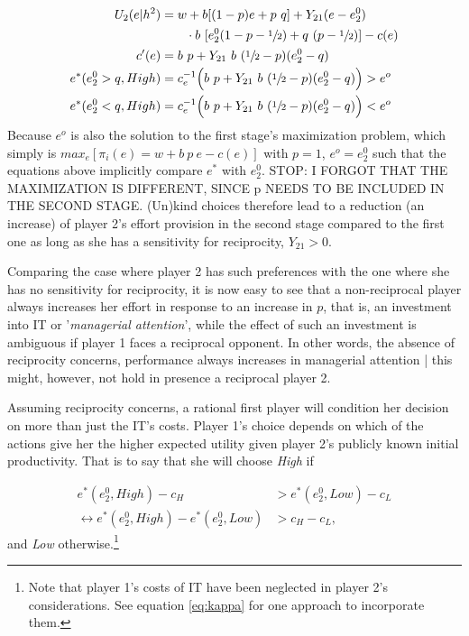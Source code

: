 \vspace{-10mm}
\begin{align*}
	U_2(e|h^2) & = w+b[(1-p)e+p\ q] + Y_{21}(e - e^0_2)\\ 
	& \qquad\cdot b\ [e^0_2(1-p-\sfrac{1}{2})+q\ (p-\sfrac{1}{2})]-c(e)\\
	c'(e) & =  b\ p + Y_{21}\ b\ (\sfrac{1}{2}-p)(e^0_2-q)\\
	e^*(e^0_2>q, High) & =c^{-1}_e\Big( b\ p + Y_{21}\ b\ (\sfrac{1}{2}-p)(e^0_2-q)\Big)>e^{o}\\
	e^*(e^0_2<q, High) & =c^{-1}_e\Big( b\ p + Y_{21}\ b\ (\sfrac{1}{2}-p)(e^0_2-q)\Big)<e^{o}
\end{align*}
Because $e^{o}$ is also the solution to the first stage's maximization problem, which simply is $max_e[\pi_i(e)= w+b\ p\ e - c(e)]$ with $p=1$, $e^{o}=e^0_2$ such that the equations above implicitly compare $e^*$ with $e^0_2$. STOP: I FORGOT THAT THE MAXIMIZATION IS DIFFERENT, SINCE p NEEDS TO BE INCLUDED IN THE SECOND STAGE. (Un)kind choices therefore lead to a reduction (an increase) of player 2's effort provision in the second stage compared to the first one as long as she has a sensitivity for reciprocity, $Y_{21}>0$.

Comparing the case where player 2 has such preferences with the one where she has no sensitivity for reciprocity, it is now easy to see that a non-reciprocal player always increases her effort in response to an increase in $p$, that is, an investment into IT or '\emph{managerial attention}', while the effect of such an investment is ambiguous if player 1 faces a reciprocal opponent. In other words, the absence of reciprocity concerns, performance always increases in managerial attention | this might, however, not hold in presence a reciprocal player 2.

Assuming reciprocity concerns, a rational first player will condition her decision on more than just the IT's costs. Player 1's choice depends on which of the actions give her the higher expected utility given player 2's publicly known initial productivity. That is to say that she will choose \textit{High} if 

\vspace{-10mm}
\begin{align*}
	e^*(e^0_2, High)-c_H &> e^*(e^0_2, Low)-c_L \\
	\leftrightarrow e^*(e^0_2, High)-e^*(e^0_2, Low) &> c_H-c_L,
\end{align*}
and \textit{Low} otherwise.\footnote{Note that player 1's costs of IT have been neglected in player 2's considerations. See equation \ref{eq:kappa} for one approach to incorporate them.}




